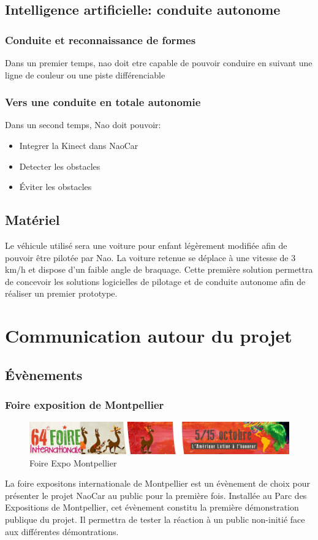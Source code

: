 \documentclass[11pt]{report} %
\begin{document}
		\subsection{Intelligence artificielle: conduite autonome}
			\subsubsection{Conduite et reconnaissance de formes}
				Dans un premier temps, nao doit etre capable de pouvoir conduire en suivant une ligne de couleur ou une piste différenciable
			\subsubsection{Vers une conduite en totale autonomie}
				Dans un second temps, Nao doit pouvoir:
				\begin{itemize}
				\item Integrer la Kinect dans NaoCar
				\item Detecter les obstacles
				\item Éviter les obstacles
				\end{itemize}
		\subsection{Matériel}
			Le véhicule utilisé sera une voiture pour enfant légèrement modifiée afin de pouvoir être pilotée par Nao. La voiture retenue se déplace à une vitesse de 3 km/h et dispose d'un faible angle de braquage. Cette première solution permettra de concevoir les solutions logicielles de pilotage et de conduite autonome afin de réaliser un premier prototype.\\
	\section{Communication autour du projet}
		\subsection{Évènements}
			\subsubsection{Foire exposition de Montpellier}
				\begin{figure}[htb]
				\centering
				\includegraphics[width=1\textwidth]{foire-expo.png}
				\caption{Foire Expo Montpellier}
				\label{fig:Foire Expo Montpellier}
				\end{figure}
				La foire expositons internationale de Montpellier est un évènement de choix pour présenter le projet NaoCar au public pour la première fois.
				Installée au Parc des Expositions de Montpellier, cet évènement constitu la première démonstration publique du projet. Il permettra de tester la réaction à un public non-initié face aux différentes démontrations.
\end{document}
